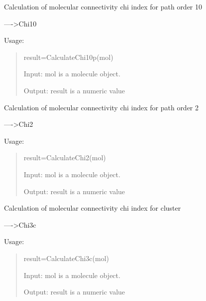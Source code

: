\documentclass[letterpaper,10pt,english]{sphinxmanual}
\begin{document}

\begin{fulllineitems}
\label{reference/connectivity:connectivity.CalculateChi10p}
Calculation of molecular connectivity chi index for path order 10

----\textgreater{}Chi10

Usage:
\begin{quote}

result=CalculateChi10p(mol)

Input: mol is a molecule object.

Output: result is a numeric value
\end{quote}

\end{fulllineitems}


\begin{fulllineitems}
\label{reference/connectivity:connectivity.CalculateChi2}
Calculation of molecular connectivity chi index for path order 2

----\textgreater{}Chi2

Usage:
\begin{quote}

result=CalculateChi2(mol)

Input: mol is a molecule object.

Output: result is a numeric value
\end{quote}

\end{fulllineitems}


\begin{fulllineitems}
\label{reference/connectivity:connectivity.CalculateChi3c}
Calculation of molecular connectivity chi index for cluster

----\textgreater{}Chi3c

Usage:
\begin{quote}

result=CalculateChi3c(mol)

Input: mol is a molecule object.

Output: result is a numeric value
\end{quote}

\end{fulllineitems}
\end{document}
